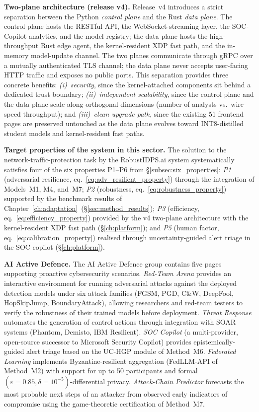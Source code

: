 \noindent\textbf{Two-plane architecture (release v4).} Release~v4
introduces a strict separation between the Python \emph{control
plane} and the Rust \emph{data plane}. The control plane hosts the
RESTful API, the WebSocket-streaming layer, the SOC-Copilot
analytics, and the model registry; the data plane hosts the
high-throughput Rust edge agent, the kernel-resident XDP fast
path, and the in-memory model-update channel. The two planes
communicate through gRPC over a mutually authenticated TLS
channel; the data plane never accepts user-facing HTTP traffic and
exposes no public ports. This separation provides three concrete
benefits: \emph{(i)~security}, since the kernel-attached components
sit behind a dedicated trust boundary; \emph{(ii)~independent
scalability}, since the control plane and the data plane scale
along orthogonal dimensions (number of analysts vs.\ wire-speed
throughput); and \emph{(iii)~clean upgrade path}, since the
existing 51 frontend pages are preserved untouched as the data
plane evolves toward INT8-distilled student models and
kernel-resident fast paths.

\noindent\textbf{Target properties of the system in this sector.}
The solution to the network-traffic-protection task by the
\textsf{RobustIDPS.ai} system systematically satisfies four of the
six properties P1--P6 from \S\ref{subsec:six_properties}:
\emph{P1} (adversarial resilience, eq.~\eqref{eq:adv_resilient_property})
through the integration of Models~M1, M4, and~M7;
\emph{P2} (robustness, eq.~\eqref{eq:robustness_property})
supported by the benchmark results of
Chapter~\ref{ch:adaptation}~(\S\ref{sec:method_results});
\emph{P3} (efficiency, eq.~\eqref{eq:efficiency_property})
provided by the v4 two-plane architecture with the kernel-resident
XDP fast path (\S\ref{ch:platform}); and
\emph{P5} (human factor, eq.~\eqref{eq:calibration_property})
realised through uncertainty-guided alert triage in the SOC
copilot (\S\ref{ch:platform}).

\noindent\textbf{AI Active Defence.} The AI Active Defence group
contains five pages supporting proactive cybersecurity scenarios.
\emph{Red-Team Arena} provides an interactive environment for
running adversarial attacks against the deployed detection models
under six attack families (FGSM, PGD, C\&W, DeepFool, HopSkipJump,
BoundaryAttack), allowing researchers and red-team testers to
verify the robustness of their trained models before deployment.
\emph{Threat Response} automates the generation of control actions
through integration with SOAR systems (Phantom, Demisto, IBM
Resilient). \emph{SOC Copilot} (a multi-provider, open-source
successor to Microsoft Security Copilot) provides
epistemically-guided alert triage based on the UC-HGP module of
Method~M6. \emph{Federated Learning} implements Byzantine-resilient
aggregation (FedLLM-API of Method~M2) with support for up to 50
participants and formal
$(\varepsilon{=}0.85,\delta{=}10^{-5})$-differential privacy.
\emph{Attack-Chain Predictor} forecasts the most probable next
steps of an attacker from observed early indicators of compromise
using the game-theoretic certification of Method~M7.

